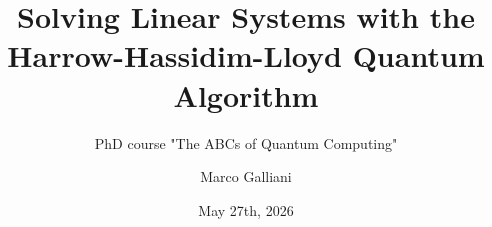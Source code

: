\documentclass{beamer}
\title{Solving Linear Systems with the \protect\\Harrow-Hassidim-Lloyd Quantum Algorithm}
\subtitle{PhD course "The ABCs of Quantum Computing"}
\author{Marco Galliani}
\date{May 27th, 2026}
\begin{document}
\begin{frame}
    \maketitle
\end{frame}


\end{document}
